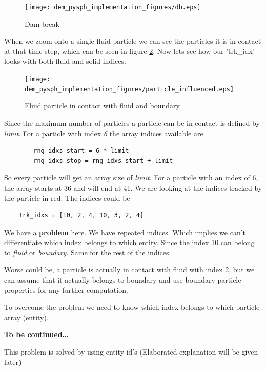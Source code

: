 \documentclass[11pt]{article}
\begin{document}
\begin{figure}[H]
\centering
\texttt{[image: dem\_pysph\_implementation\_figures/db.eps]}
\caption{Dam break\label{fig:db}}
\end{figure}

When we zoom onto a single fluid particle we can see the particles it is in
contact at that time step, which can be seen in figure
\ref{fig:par_cntct_fluid_boundary}. Now lets see how our 'trk\_idx' looks with
both fluid and solid indices.

\begin{figure}[H]
\centering
\texttt{[image: dem\_pysph\_implementation\_figures/particle\_influenced.eps]}
\caption{Fluid particle in contact with fluid and boundary\label{fig:par_cntct_fluid_boundary}}
\end{figure}

Since the maximum number of particles a particle can be in contact is defined by \emph{limit}. For a
particle with index \emph{6} the array indices available are

\begin{verbatim}
    	rng_idxs_start = 6 * limit
    	rng_idxs_stop = rng_idxs_start + limit
\end{verbatim}

So every particle will get an array size of \emph{limit}. For a particle with an
index of 6, the array starts at 36 and will end at 41. We are looking at the
indices tracked by the particle in red. The indices could be

\begin{verbatim}
	trk_idxs = [10, 2, 4, 10, 3, 2, 4]
\end{verbatim}

We have a \textbf{problem} here. We have repeated indices. Which implies we can't
differentiate which index belongs to which entity. Since the index 10 can
belong to \emph{fluid} or \emph{boundary}.  Same for the rest of the indices.

Worse could be, a particle is actually in contact with fluid with index 2,
but we can assume that it actually belongs to boundary and use boundary
particle properties for any further computation.

To overcome the problem we need to know which index belongs to which particle
array (entity).

\textbf{To be continued\ldots{}}

This problem is solved by using entity id's (Elaborated explanation will be
given later)
\end{document}
